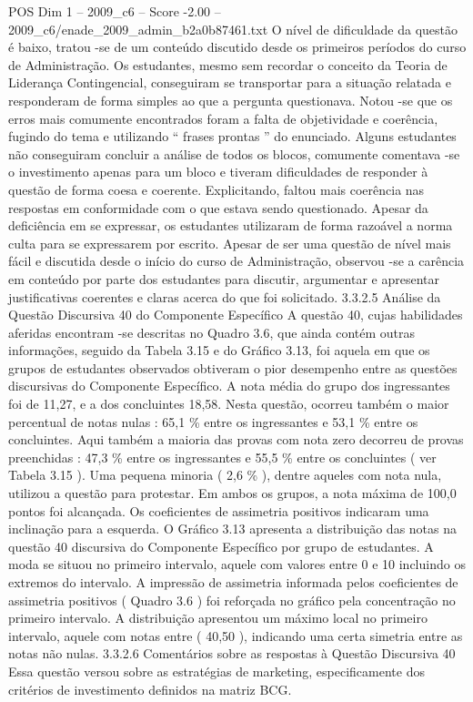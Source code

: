 \begin{textsample}{POS Dim 1 – 2009\_c6 – Score -2.00 – 2009\_c6/enade\_2009\_admin\_b2a0b87461.txt}
O nível de dificuldade da questão é baixo, tratou -se de um conteúdo discutido desde os primeiros períodos do curso de Administração.
Os estudantes, mesmo sem recordar o conceito da Teoria de Liderança Contingencial, conseguiram se transportar para a situação relatada e responderam de forma simples ao que a pergunta questionava.
Notou -se que os erros mais comumente encontrados foram a falta de objetividade e coerência, fugindo do tema e utilizando “ frases prontas ” do enunciado.
Alguns estudantes não conseguiram concluir a análise de todos os blocos, comumente comentava -se o investimento apenas para um bloco e tiveram dificuldades de responder à questão de forma coesa e coerente.
Explicitando, faltou mais coerência nas respostas em conformidade com o que estava sendo questionado.
Apesar da deficiência em se expressar, os estudantes utilizaram de forma razoável a norma culta para se expressarem por escrito.
Apesar de ser uma questão de nível mais fácil e discutida desde o início do curso de Administração, observou -se a carência em conteúdo por parte dos estudantes para discutir, argumentar e apresentar justificativas coerentes e claras acerca do que foi solicitado. 3.3.2.5 Análise da Questão Discursiva 40 do Componente Específico A questão 40, cujas habilidades aferidas encontram -se descritas no Quadro 3.6, que ainda contém outras informações, seguido da Tabela 3.15 e do Gráfico 3.13, foi aquela em que os grupos de estudantes observados obtiveram o pior desempenho entre as questões discursivas do Componente Específico.
A nota média do grupo dos ingressantes foi de 11,27, e a dos concluintes 18,58.
Nesta questão, ocorreu também o maior percentual de notas nulas : 65,1 \% entre os ingressantes e 53,1 \% entre os concluintes.
Aqui também a maioria das provas com nota zero decorreu de provas preenchidas : 47,3 \% entre os ingressantes e 55,5 \% entre os concluintes ( ver Tabela 3.15 ).
Uma pequena minoria ( 2,6 \% ), dentre aqueles com nota nula, utilizou a questão para protestar.
Em ambos os grupos, a nota máxima de 100,0 pontos foi alcançada.
Os coeficientes de assimetria positivos indicaram uma inclinação para a esquerda.
O Gráfico 3.13 apresenta a distribuição das notas na questão 40 discursiva do Componente Específico por grupo de estudantes.
A moda se situou no primeiro intervalo, aquele com valores entre 0 e 10 incluindo os extremos do intervalo.
A impressão de assimetria informada pelos coeficientes de assimetria positivos ( Quadro 3.6 ) foi reforçada no gráfico pela concentração no primeiro intervalo.
A distribuição apresentou um máximo local no primeiro intervalo, aquele com notas entre ( 40,50 ), indicando uma certa simetria entre as notas não nulas. 3.3.2.6 Comentários sobre as respostas à Questão Discursiva 40 Essa questão versou sobre as estratégias de marketing, especificamente dos critérios de investimento definidos na matriz BCG.

\end{textsample}
